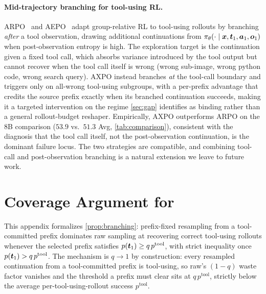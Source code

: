 \paragraph{Mid-trajectory branching for tool-using RL.}
ARPO~\citep{arpo} and AEPO~\citep{aepo} adapt group-relative RL to tool-using rollouts by branching \emph{after} a tool observation, drawing additional continuations from $\pi_\theta(\cdot \mid {\bm{x}}, {\bm{t}}_1, {\bm{a}}_1, {\bm{o}}_1)$ when post-observation entropy is high. The exploration target is the continuation given a fixed tool call, which absorbs variance introduced by the tool output but cannot recover when the tool call itself is wrong (wrong sub-image, wrong python code, wrong search query). AXPO instead branches \emph{at} the tool-call boundary and triggers only on all-wrong tool-using subgroups, with a per-prefix advantage that credits the source prefix exactly when its branched continuation succeeds, making it a targeted intervention on the regime \autoref{sec:gap} identifies as binding rather than a general rollout-budget reshaper. Empirically, AXPO outperforms ARPO on the 8B comparison ($53.9$ vs.\ $51.3$ Avg, \autoref{tab:comparison}), consistent with the diagnosis that the tool call itself, not the post-observation continuation, is the dominant failure locus. The two strategies are compatible, and combining tool-call and post-observation branching is a natural extension we leave to future work.

\section{Coverage Argument for \Toolresample}
\label{app:coverage}

This appendix formalizes \autoref{prop:branching}: prefix-fixed resampling from a tool-committed prefix dominates raw sampling at recovering correct tool-using rollouts whenever the selected prefix satisfies $p({\bm{t}}_1) \geq q\, p^{\text{tool}}$, with strict inequality once $p({\bm{t}}_1) > q\, p^{\text{tool}}$. The mechanism is $q \to 1$ by construction: every resampled continuation from a tool-committed prefix is tool-using, so raw's $(1-q)$ waste factor vanishes and the threshold a prefix must clear sits at $q\, p^{\text{tool}}$, strictly below the average per-tool-using-rollout success $p^{\text{tool}}$.

